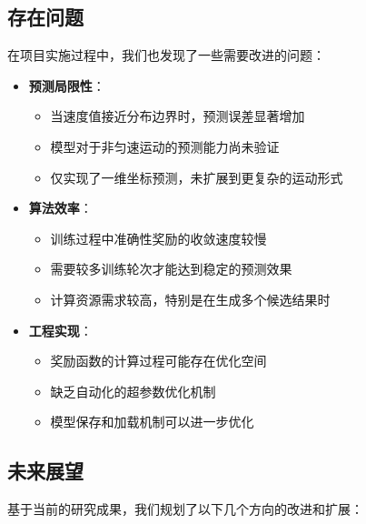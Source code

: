 \documentclass[a4paper, 12pt]{article}
\begin{document}
\subsection{存在问题}
在项目实施过程中，我们也发现了一些需要改进的问题：

\begin{itemize}
    \item \textbf{预测局限性}：
        \begin{itemize}
            \item 当速度值接近分布边界时，预测误差显著增加
            \item 模型对于非匀速运动的预测能力尚未验证
            \item 仅实现了一维坐标预测，未扩展到更复杂的运动形式
        \end{itemize}
    
    \item \textbf{算法效率}：
        \begin{itemize}
            \item 训练过程中准确性奖励的收敛速度较慢
            \item 需要较多训练轮次才能达到稳定的预测效果
            \item 计算资源需求较高，特别是在生成多个候选结果时
        \end{itemize}
    
    \item \textbf{工程实现}：
        \begin{itemize}
            \item 奖励函数的计算过程可能存在优化空间
            \item 缺乏自动化的超参数优化机制
            \item 模型保存和加载机制可以进一步优化
        \end{itemize}
\end{itemize}

\subsection{未来展望}
基于当前的研究成果，我们规划了以下几个方向的改进和扩展：
\end{document}
